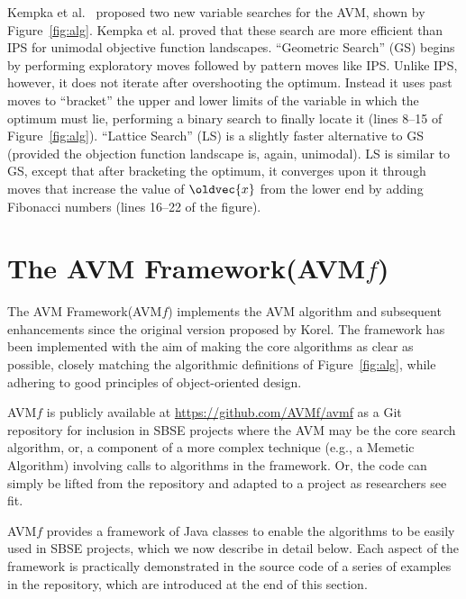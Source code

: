 \documentclass{llncs}
\let\vec\oldvec %
\newcommand{\longname}{AVM Framework\xspace}
\newcommand{\name}{AVM\hspace{-1pt}$f$\xspace}
\newcommand{\repourl}{\url{https://github.com/AVMf/avmf}\xspace}
\newcommand{\inlineheading}[1]{\vspace{1mm} \noindent {\bf #1.}}
\begin{document}
\inlineheading{New Variable Search Algorithms}
Kempka et al.~\cite{Kempka2015} proposed two new variable searches for the AVM, shown by Figure~\ref{fig:alg}. Kempka et al. proved that these search are more efficient than IPS for unimodal objective function landscapes. ``Geometric Search'' (GS) begins by performing exploratory moves followed by pattern moves like IPS. Unlike IPS, however, it does not iterate after overshooting the optimum. Instead it uses past moves to  ``bracket'' the upper and lower limits of the variable in which the optimum must lie, performing a binary search to finally locate it (lines 8--15 of Figure~\ref{fig:alg}). ``Lattice Search'' (LS) is a slightly faster alternative to GS (provided the objection function landscape is, again, unimodal). LS is similar to GS, except that after bracketing the optimum, it converges upon it through moves that increase the value of $\vec{x}$ from the lower end by adding Fibonacci numbers (lines 16--22 of the figure).

\vspace{-1em}
\section{The \longname (\name)}
\vspace{-1ex}
\label{sec:avmf}
The \longname (\name) implements the AVM algorithm and subsequent enhancements since the original version proposed by Korel. The framework has been implemented with the aim of making the core algorithms as clear as possible, closely matching the algorithmic definitions of Figure~\ref{fig:alg}, while adhering to good principles of object-oriented design.

\name is publicly available at \repourl as a Git repository for inclusion in SBSE projects where the AVM may be the core search algorithm, or, a component of a more complex technique (e.g., a Memetic Algorithm) involving calls to algorithms in the framework. Or, the code can simply be lifted from the repository and adapted to a project as researchers see fit.

\name provides a framework of Java classes to enable the algorithms to be easily used in SBSE projects, which we now describe in detail below. Each aspect of the framework is practically demonstrated in the source code of a series of examples in the repository, which are introduced at the end of this section.
\end{document}
